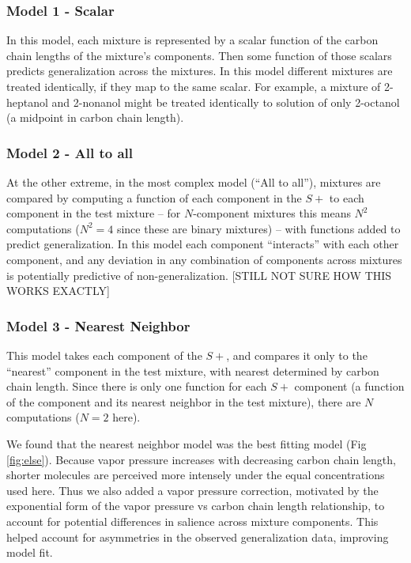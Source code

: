 \subsubsection{Model 1 - Scalar}
In this model, each mixture is represented by a scalar function of the carbon chain lengths of the mixture’s components.  Then some function of those scalars predicts generalization across the mixtures.  In this model different mixtures are treated identically, if they map to the same scalar.  For example, a mixture of 2-heptanol and 2-nonanol might be treated identically to solution of only 2-octanol (a midpoint in carbon chain length).  

\subsubsection{Model 2 - All to all}
At the other extreme, in the most complex model (``All to all''), mixtures are compared by computing a function of each component in the $S+$ to each component in the test mixture -- for $N$-component mixtures this means $N^2$ computations ($N^2 = 4$ since these are binary mixtures) -- with functions added to predict generalization.  In this model each component ``interacts'' with each other component, and any deviation in any combination of components across mixtures is potentially predictive of non-generalization.  
[STILL NOT SURE HOW THIS WORKS EXACTLY]

\subsubsection{Model 3 - Nearest Neighbor}
This model takes each component of the $S+$, and compares it only to the ``nearest'' component in the test mixture, with nearest determined by carbon chain length.  Since there is only one function for each $S+$ component (a function of the component and its nearest neighbor in the test mixture), there are $N$ computations ($N=2$ here).  

We found that the nearest neighbor model was the best fitting model (Fig \ref{fig:else}).  Because vapor pressure increases with decreasing carbon chain length, shorter molecules are perceived more intensely under the equal concentrations used here.  Thus we also added a vapor pressure correction, motivated by the exponential form of the vapor pressure vs carbon chain length relationship, to account for potential differences in salience across mixture components.  This helped account for asymmetries in the observed generalization data, improving model fit.  